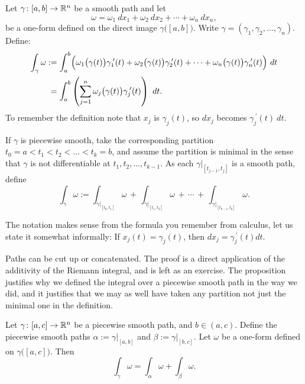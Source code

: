 \begin{defn}
Let $\gamma \colon [a,b] \to {\mathbb{R}}^n$ be a smooth path
and let
\begin{equation*}
\omega = \omega_1 ~dx_1 + \omega_2 ~dx_2 + \cdots + \omega_n ~dx_n ,
\end{equation*}
be a one-form defined on the direct image $\gamma\bigl([a,b]\bigr)$.
Write $\gamma = (\gamma_1,\gamma_2,\ldots,\gamma_n)$.
Define:
\begin{equation*}
\begin{split}
\int_{\gamma} \omega
& :=
\int_a^b 
\Bigl(
\omega_1\bigl(\gamma(t)\bigr) \gamma_1^{\:\prime}(t) +
\omega_2\bigl(\gamma(t)\bigr) \gamma_2^{\:\prime}(t) + \cdots +
\omega_n\bigl(\gamma(t)\bigr) \gamma_n^{\:\prime}(t) \Bigr) ~ dt
\\
&\phantom{:}=
\int_a^b 
\left(
\sum_{j=1}^n
\omega_j\bigl(\gamma(t)\bigr) \gamma_j^{\:\prime}(t) \right) ~ dt .
\end{split}
\end{equation*}
To remember the definition note that $x_j$ is $\gamma_j(t)$, so
$dx_j$ becomes  $\gamma_j^{\:\prime}(t) ~ dt$.

If $\gamma$ is piecewise smooth, take the corresponding partition
$t_0 = a < t_1 < t_2 < \ldots < t_k = b$, and assume the partition is
minimal
in the sense that $\gamma$ is not differentiable
at $t_1,t_2,\ldots,t_{k-1}$.  As each $\gamma|_{[t_{j-1},t_j]}$ is
a smooth path, define
\begin{equation*}
\int_{\gamma} \omega
:=
\int_{\gamma|_{[t_0,t_1]}} \omega
\,
+
\,
\int_{\gamma|_{[t_1,t_2]}} \omega
\,
+ \, \cdots \, + \,
\int_{\gamma|_{[t_{k-1},t_k]}} \omega .
\end{equation*}
\end{defn}

The notation makes sense from the formula you remember from calculus,
let us state it somewhat informally:
If $x_j(t) = \gamma_j(t)$, then $dx_j = \gamma_j^{\:\prime}(t) dt$.

Paths can be cut up or concatenated.  The proof is a direct application
of the additivity of the Riemann integral, and is left as an exercise.
The proposition justifies why we defined the integral over a piecewise
smooth path in the way we did, and it justifies that we may as well
have taken any partition not just the minimal one in the definition.

\begin{prop} \label{mv:prop:pathconcat}
Let $\gamma \colon [a,c] \to {\mathbb{R}}^n$ be a piecewise smooth path,
and $b \in (a,c)$.
Define the piecewise smooth paths
$\alpha := \gamma|_{[a,b]}$ and
$\beta := \gamma|_{[b,c]}$.
Let $\omega$ be a one-form defined on
$\gamma\bigl([a,c]\bigr)$.  Then
\begin{equation*}
\int_{\gamma} \omega =
\int_{\alpha} \omega +
\int_{\beta} \omega .
\end{equation*}
\end{prop}


